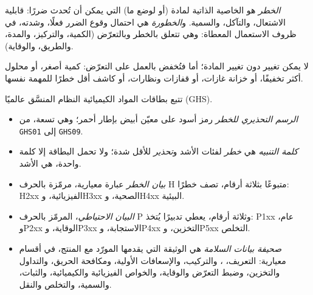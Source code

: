 \begin{definition}\label{def:b1:lab-techniques-1:hazard}
\emph{الخطر} هو الخاصية الذاتية لمادة (أو
لوضع ما) التي يمكن أن تُحدث ضررًا: قابلية الاشتعال، والتآكل،
والسمية. و\emph{الخطورة} هي احتمال وقوع الضرر فعلًا،
وشدته، في ظروف الاستعمال المعطاة: وهي تتعلق
بالخطر وبالتعرّض (الكمية، والتركيز، والمدة، والطريق،
والوقاية).
\end{definition}

لا يمكن تغيير  دون تغيير المادة؛ أما  فتُخفض
بالعمل على التعرّض: كمية أصغر، أو محلول أكثر تخفيفًا،
أو خزانة غازات، أو قفازات ونظارات، أو كاشف أقل خطرًا
للمهمة نفسها.

\begin{definition}\label{def:b1:lab-techniques-1:ghs}
تتبع بطاقات المواد الكيميائية النظام المنسَّق عالميًا (GHS).
\begin{itemize}
  \item \emph{الرسم التحذيري للخطر} رمز أسود
        على معيّن أبيض بإطار أحمر؛ وهي تسعة، من \texttt{GHS01}
        إلى \texttt{GHS09}.
  \item \emph{كلمة التنبيه} هي \emph{خطر} لفئات
         الأشد و\emph{تحذير} للأقل
        شدة؛ ولا تحمل البطاقة إلا كلمة واحدة، هي الأشد.
  \item \emph{بيان الخطر} عبارة معيارية،
        مرمّزة بالحرف H متبوعًا بثلاثة أرقام، تصف خطرًا:
        H2xx  الفيزيائية، وH3xx  الصحية، وH4xx 
        البيئية.
  \item \emph{البيان الاحتياطي}،
        المرمّز بالحرف P وثلاثة أرقام، يعطي تدبيرًا يُتخذ: P1xx عام،
        وP2xx الوقاية، وP3xx الاستجابة، وP4xx التخزين، وP5xx التخلص.
  \item \emph{صحيفة بيانات السلامة} هي
        الوثيقة التي يقدمها المورّد مع المنتج، في أقسام
        معيارية: التعريف، ، والتركيب، والإسعافات الأولية،
        ومكافحة الحريق، والتداول والتخزين، وضبط التعرّض
        والوقاية، والخواص الفيزيائية والكيميائية، والثبات، والسمية،
        والتخلص والنقل.
\end{itemize}
\end{definition}

